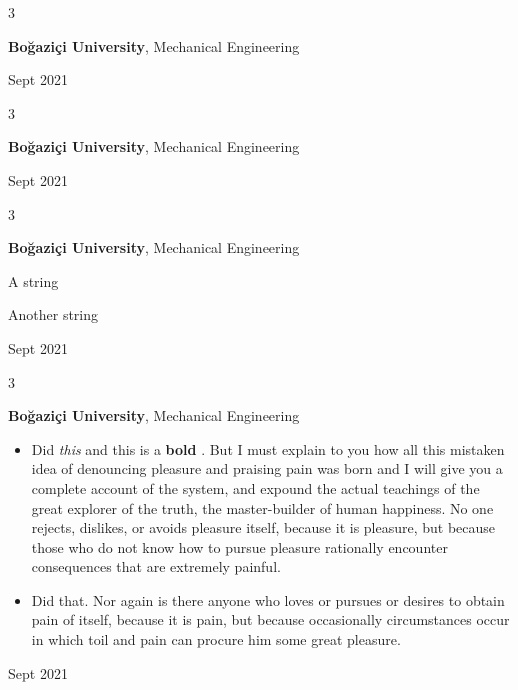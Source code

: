 \documentclass[10pt, letterpaper]{article}
\newenvironment{summary}{
    \begin{description}[
        topsep=0.10 cm,
        parsep=0.10 cm,
        partopsep=0pt,
        itemsep=0pt,
        leftmargin=0.4 cm + 10pt
    ]
}{
    \end{description}
} %
\newenvironment{highlights}{
    \begin{itemize}[
        topsep=0.10 cm,
        parsep=0.10 cm,
        partopsep=0pt,
        itemsep=0pt,
        leftmargin=0.4 cm + 10pt
    ]
}{
    \end{itemize}
} %
\newenvironment{threecolentry}[3][]{
    \onecolentry
    \def\thirdColumn{#3}
    \setcolumnwidth{1 cm, \fill, 4.5 cm}
    \begin{paracol}{3}
    {\raggedright #2} \switchcolumn
}{
    \switchcolumn \raggedleft \thirdColumn
    \end{paracol}
    \endonecolentry
} %
\let\hrefWithoutArrow\href
\renewcommand{\href}[2]{\hrefWithoutArrow{#1}{\ifthenelse{\equal{#2}{}}{ }{#2 }\raisebox{.15ex}{\footnotesize \faExternalLink*}}}
\begin{document}
        \vspace{0.2 cm}

        \begin{threecolentry}{\textbf{}}{
            Sept 2021
        }
            \textbf{Boğaziçi University}, Mechanical Engineering
        \end{threecolentry}

        \vspace{0.2 cm}

        \begin{threecolentry}{\textbf{}}{
            Sept 2021
        }
            \textbf{Boğaziçi University}, Mechanical Engineering
        \end{threecolentry}

        \vspace{0.2 cm}

        \begin{threecolentry}{\textbf{}}{
            Sept 2021
        }
            \textbf{Boğaziçi University}, Mechanical Engineering
            \begin{summary}
                \item A string
                \item Another string
            \end{summary}
        \end{threecolentry}

        \vspace{0.2 cm}

        \begin{threecolentry}{\textbf{}}{
            Sept 2021
        }
            \textbf{Boğaziçi University}, Mechanical Engineering
            \begin{highlights}
                \item Did \textit{this} and this is a \textbf{bold} \href{https://example.com}{link}. But I must explain to you how all this mistaken idea of denouncing pleasure and praising pain was born and I will give you a complete account of the system, and expound the actual teachings of the great explorer of the truth, the master-builder of human happiness. No one rejects, dislikes, or avoids pleasure itself, because it is pleasure, but because those who do not know how to pursue pleasure rationally encounter consequences that are extremely painful.
                \item Did that. Nor again is there anyone who loves or pursues or desires to obtain pain of itself, because it is pain, but because occasionally circumstances occur in which toil and pain can procure him some great pleasure.
            \end{highlights}
        \end{threecolentry}
\end{document}
